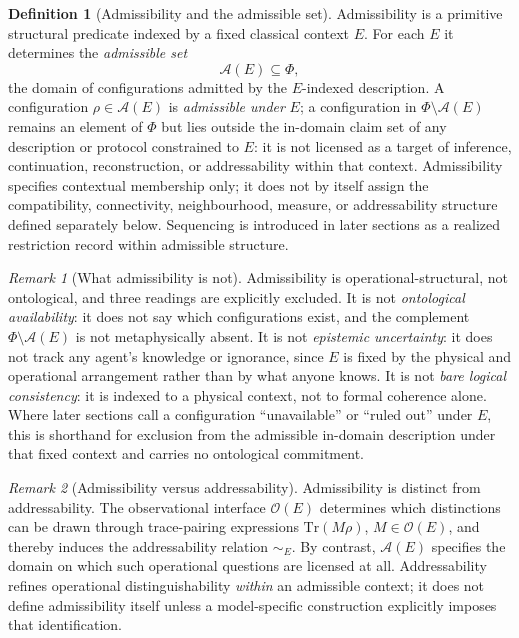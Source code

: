 \documentclass[aps,prx,onecolumn,11pt]{revtex4-2}
\theoremstyle{plain}
\theoremstyle{definition}
\newtheorem{definition}{Definition}
\theoremstyle{remark}
\newtheorem{remark}{Remark}
\begin{document}
\begin{definition}[Admissibility and the admissible set]
\label{def:admissibility}
Admissibility is a primitive structural predicate indexed by a fixed
classical context \(E\). For each \(E\) it determines the
\emph{admissible set}
\[
\mathcal{A}(E) \subseteq \Phi,
\]
the domain of configurations admitted by the \(E\)-indexed description.
A configuration \(\rho \in \mathcal{A}(E)\) is \emph{admissible under}
\(E\); a configuration in \(\Phi \setminus \mathcal{A}(E)\) remains an
element of \(\Phi\) but lies outside the in-domain claim set of any
description or protocol constrained to \(E\): it is not licensed as a
target of inference, continuation, reconstruction, or addressability
within that context. Admissibility specifies contextual membership
only; it does not by itself assign the compatibility, connectivity,
neighbourhood, measure, or addressability structure defined separately
below. Sequencing is introduced in later sections as a realized
restriction record within admissible structure.
\end{definition}

\begin{remark}[What admissibility is not]
\label{rem:admissibility_exclusions}
Admissibility is operational-structural, not ontological, and three
readings are explicitly excluded. It is not \emph{ontological
availability}: it does not say which configurations exist, and the
complement \(\Phi \setminus \mathcal{A}(E)\) is not metaphysically
absent. It is not \emph{epistemic uncertainty}: it does not track any
agent's knowledge or ignorance, since \(E\) is fixed by the physical and
operational arrangement rather than by what anyone knows. It is not
\emph{bare logical consistency}: it is indexed to a physical context,
not to formal coherence alone. Where later sections call a configuration
``unavailable'' or ``ruled out'' under \(E\), this is shorthand for
exclusion from the admissible in-domain description under that fixed
context and carries no ontological commitment.
\end{remark}

\begin{remark}[Admissibility versus addressability]
\label{rem:admissibility_vs_addressability}
Admissibility is distinct from addressability. The observational
interface \(\mathcal{O}(E)\) determines which distinctions can be drawn
through trace-pairing expressions \(\mathrm{Tr}(M\rho)\),
\(M \in \mathcal{O}(E)\), and thereby induces the addressability
relation \(\sim_E\). By contrast, \(\mathcal{A}(E)\) specifies the
domain on which such operational questions are licensed at all.
Addressability refines operational distinguishability \emph{within} an
admissible context; it does not define admissibility itself unless a
model-specific construction explicitly imposes that identification.
\end{remark}
\end{document}
